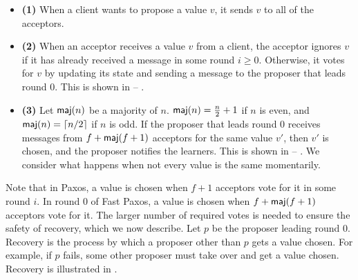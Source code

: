 \begin{itemize}
  \item \textbf{(1)}
    When a client wants to propose a value $v$, it sends $v$ to all of the
    acceptors.

  \item \textbf{(2)}
    When an acceptor receives a value $v$ from a client, the acceptor ignores
    $v$ if it has already received a message in some round $i \geq 0$.
    Otherwise, it votes for $v$ by updating its state and sending a
     message to the proposer that leads round $0$. This is
    shown in   --
    .

  \item \textbf{(3)}
    Let $\textsf{maj}(n)$ be a majority of $n$. $\textsf{maj}(n) = \frac{n}{2} + 1$ if $n$ is
    even, and $\textsf{maj}(n) = \lceil n/2\rceil$ if $n$ is odd. If the proposer that leads
    round $0$ receives  messages from $f + \textsf{maj}(f+1)$
    acceptors for the same value $v'$, then $v'$ is chosen, and the proposer
    notifies the learners. This is shown in 
     -- . We consider what happens when
    not every value is the same momentarily.
\end{itemize}

Note that in Paxos, a value is chosen when $f+1$ acceptors vote for it in some
round $i$. In round $0$ of Fast Paxos, a value is chosen when $f + \textsf{maj}(f+1)$
acceptors vote for it. The larger number of required votes is needed to ensure
the safety of recovery, which we now describe.
%
Let $p$ be the proposer leading round $0$. Recovery is the process by which a
proposer other than $p$ gets a value chosen. For example, if $p$ fails, some
other proposer must take over and get a value chosen. Recovery is illustrated
in .

